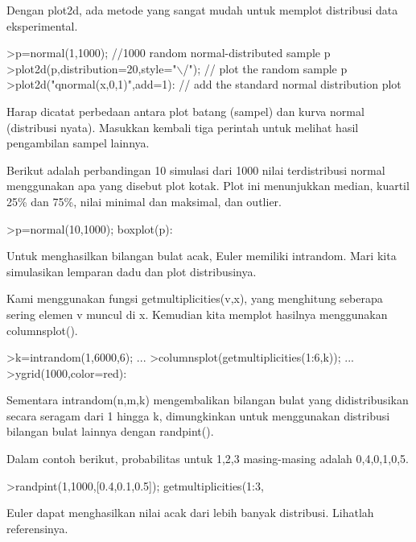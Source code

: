 \documentclass[a4paper,10pt]{article}
\begin{document}
\begin{eulernotebook}
\begin{eulercomment}
Dengan plot2d, ada metode yang sangat mudah untuk memplot distribusi
data eksperimental.
\end{eulercomment}
\begin{eulerprompt}
>p=normal(1,1000); //1000 random normal-distributed sample p
>plot2d(p,distribution=20,style="\(\backslash\)/"); // plot the random sample p
>plot2d("qnormal(x,0,1)",add=1): // add the standard normal distribution plot
\end{eulerprompt}
\begin{eulercomment}
Harap dicatat perbedaan antara plot batang (sampel) dan kurva normal
(distribusi nyata). Masukkan kembali tiga perintah untuk melihat hasil
pengambilan sampel lainnya.
\end{eulercomment}
\begin{eulercomment}
Berikut adalah perbandingan 10 simulasi dari 1000 nilai terdistribusi
normal menggunakan apa yang disebut plot kotak. Plot ini menunjukkan
median, kuartil 25\% dan 75\%, nilai minimal dan maksimal, dan outlier.
\end{eulercomment}
\begin{eulerprompt}
>p=normal(10,1000); boxplot(p):
\end{eulerprompt}
\begin{eulercomment}
Untuk menghasilkan bilangan bulat acak, Euler memiliki intrandom. Mari
kita simulasikan lemparan dadu dan plot distribusinya.

Kami menggunakan fungsi getmultiplicities(v,x), yang menghitung
seberapa sering elemen v muncul di x. Kemudian kita memplot hasilnya
menggunakan columnsplot().
\end{eulercomment}
\begin{eulerprompt}
>k=intrandom(1,6000,6);  ...
>columnsplot(getmultiplicities(1:6,k));  ...
>ygrid(1000,color=red):
\end{eulerprompt}
\begin{eulercomment}
Sementara intrandom(n,m,k) mengembalikan bilangan bulat yang
didistribusikan secara seragam dari 1 hingga k, dimungkinkan untuk
menggunakan distribusi bilangan bulat lainnya dengan randpint().

Dalam contoh berikut, probabilitas untuk 1,2,3 masing-masing adalah
0,4,0,1,0,5.
\end{eulercomment}
\begin{eulerprompt}
>randpint(1,1000,[0.4,0.1,0.5]); getmultiplicities(1:3,%
\end{eulerprompt}
\begin{euleroutput}
  [378,  102,  520]
\end{euleroutput}
\begin{eulercomment}
Euler dapat menghasilkan nilai acak dari lebih banyak distribusi.
Lihatlah referensinya.


\end{eulercomment}
\end{eulernotebook}
\end{document}
